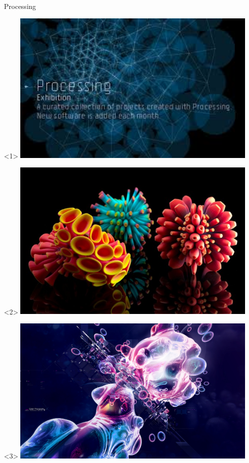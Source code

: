 \begin{frame}{Processing}
  \begin{onlyenv}<1>
  \includegraphics [width=0.9\textwidth]{processing_a.jpg}    
  \end{onlyenv}
  \begin{onlyenv}<2>
  \includegraphics [width=0.9\textwidth]{processing_b.jpg}    
  \end{onlyenv}
  \begin{onlyenv}<3>
  \includegraphics [width=0.9\textwidth]{processing_c.jpg}    
  \end{onlyenv}
\end{frame}


